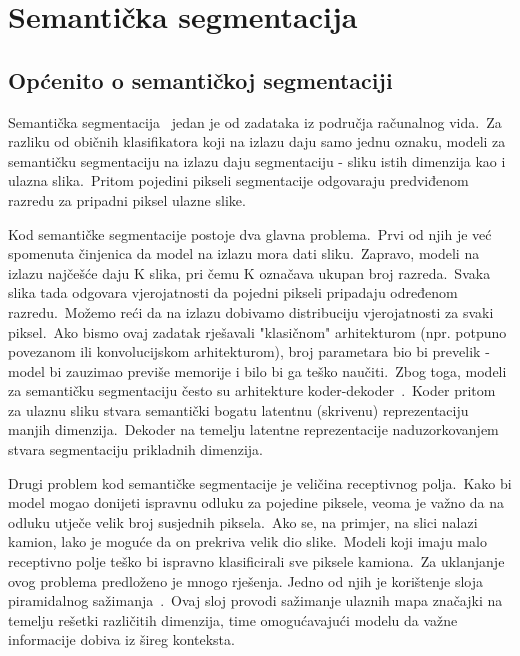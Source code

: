 \documentclass[times, utf8, seminar, numeric]{fer}
\begin{document}
\chapter{Semantička segmentacija}

\section{Općenito o semantičkoj segmentaciji}

Semantička segmentacija~\cite{garcia2017review} jedan je od zadataka iz područja računalnog vida.\ 
Za razliku od običnih klasifikatora koji na izlazu daju samo jednu oznaku, modeli za semantičku segmentaciju na izlazu daju segmentaciju - sliku istih dimenzija kao i ulazna slika.\ 
Pritom pojedini pikseli segmentacije odgovaraju predviđenom razredu za pripadni piksel ulazne slike.\ 

Kod semantičke segmentacije postoje dva glavna problema.\ Prvi od njih je već spomenuta činjenica da model na izlazu mora dati sliku.\ 
Zapravo, modeli na izlazu najčešće daju K slika, pri čemu K označava ukupan broj razreda.\ Svaka slika tada odgovara vjerojatnosti da pojedni pikseli pripadaju određenom razredu.\ 
Možemo reći da na izlazu dobivamo distribuciju vjerojatnosti za svaki piksel.\
Ako bismo ovaj zadatak rješavali "klasičnom" arhitekturom (npr. potpuno povezanom ili konvolucijskom arhitekturom), broj parametara bio bi prevelik - model bi zauzimao previše memorije i bilo bi ga teško naučiti.\
Zbog toga, modeli za semantičku segmentaciju često su arhitekture koder-dekoder~\cite{badrinarayanan2017segnet}.\ 
Koder pritom za ulaznu sliku stvara semantički bogatu latentnu (skrivenu) reprezentaciju manjih dimenzija.\ 
Dekoder na temelju latentne reprezentacije naduzorkovanjem stvara segmentaciju prikladnih dimenzija.\
  
Drugi problem kod semantičke segmentacije je veličina receptivnog polja.\ 
Kako bi model mogao donijeti ispravnu odluku za pojedine piksele, veoma je važno da na odluku utječe velik broj susjednih piksela.\
Ako se, na primjer, na slici nalazi kamion, lako je moguće da on prekriva velik dio slike.\ 
Modeli koji imaju malo receptivno polje teško bi ispravno klasificirali sve piksele kamiona.\ 
Za uklanjanje ovog problema predloženo je mnogo rješenja. Jedno od njih je korištenje sloja piramidalnog sažimanja~\cite{he2015spatial}.\
Ovaj sloj provodi sažimanje ulaznih mapa značajki na temelju rešetki različitih dimenzija, time omogućavajući modelu da važne informacije dobiva iz šireg konteksta.\ 
\end{document}
